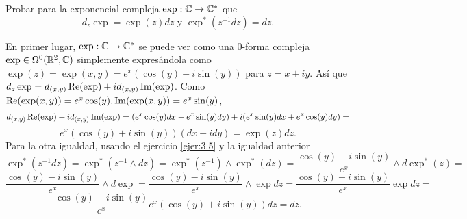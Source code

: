 \documentclass[twoside]{article}
\begin{document}
\begin{ejercicio}{3.7}
Probar para la exponencial compleja $\exp :\mathbb{C}\to\mathbb{C}^*$ que
\[
d_z\exp =\exp(z)dz\text{ y } \exp^*(z^{-1}dz)=dz.
\]
\end{ejercicio}
\begin{solucion}
En primer lugar, $\exp :\mathbb{C}\to\mathbb{C}^*$ se puede ver como una 0-forma compleja $\exp\in\Omega^0(\mathbb{R}^2,\mathbb{C})$ simplemente expresándola como $\exp(z)=\exp(x,y)=e^x(\cos(y)+i\sin(y))$ para $z=x+iy$. Así que $d_z\exp=d_{(x,y)}\operatorname{Re}(\exp)+id_{(x,y)}\operatorname{Im}(\exp)$. Como $\operatorname{Re}(\exp(x,y))=e^x\cos(y), \operatorname{Im}(\exp(x,y))=e^x\sin(y)$,
\[
d_{(x,y)}\operatorname{Re}(\exp)+id_{(x,y)}\operatorname{Im}(\exp)=(e^x\cos(y)dx-e^x\sin(y)dy)+i(e^x\sin(y)dx+e^x\cos(y)dy)=
\]
\[
e^x(\cos(y)+i\sin(y))(dx+idy)=\exp(z)dz.
\]
Para la otra igualdad, usando el ejercicio \ref{ejer:3.5} y la igualdad anterior
\[
\exp^*(z^{-1}dz)=\exp^*(z^{-1}\land dz)=\exp^*(z^{-1})\land\exp^*(dz)=\frac{\cos(y)-i\sin(y)}{e^x}\land d\exp^*(z)=
\]
\[
\frac{\cos(y)-i\sin(y)}{e^x}\land d\exp=\frac{\cos(y)-i\sin(y)}{e^x}\land \exp dz=\frac{\cos(y)-i\sin(y)}{e^x} \exp dz=
\]
\[
\frac{\cos(y)-i\sin(y)}{e^x}e^x(\cos(y)+i\sin(y))dz=dz.
\]



\end{solucion}
\end{document}
